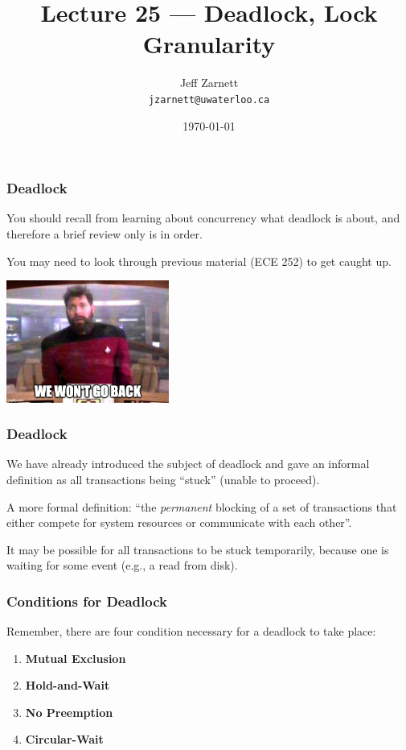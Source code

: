 

\title{Lecture 25 --- Deadlock, Lock Granularity}

\author{Jeff Zarnett \\ \small \texttt{jzarnett@uwaterloo.ca}}
\date{\today}




\begin{frame}
  \titlepage

 \end{frame}

\begin{frame}
\frametitle{Deadlock}

You should recall from learning about concurrency what deadlock is about, and therefore a brief review only is in order. 

You may need to look through previous material (ECE 252) to get caught up.

\begin{center}
	\includegraphics[width=0.4\textwidth]{images/goback.jpg}
\end{center}


\end{frame}

\begin{frame}
\frametitle{Deadlock}
We have already introduced the subject of deadlock and gave an informal definition as all transactions being ``stuck'' (unable to proceed). 

A more formal definition: ``the \textit{permanent} blocking of a set of transactions that either compete for system resources or communicate with each other''. 


It may be possible for all transactions to be stuck temporarily, because one is waiting for some event (e.g., a read from disk).

\end{frame}

\begin{frame}
\frametitle{Conditions for Deadlock}
Remember, there are four condition necessary for a deadlock to take place:

\begin{enumerate}
	\item \textbf{Mutual Exclusion}
	\item \textbf{Hold-and-Wait}
	\item \textbf{No Preemption}
	\item \textbf{Circular-Wait}
\end{enumerate}

\end{frame}


